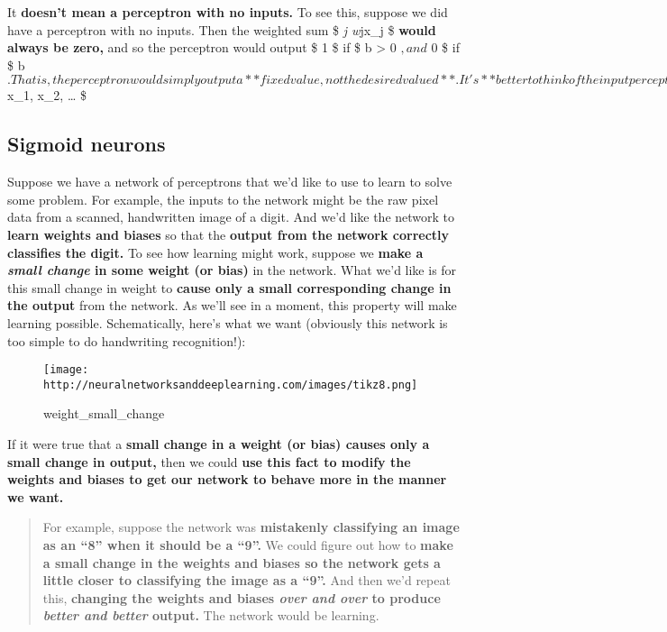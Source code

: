 \documentclass[]{article}
\begin{document}
It \textbf{doesn't mean a perceptron with no inputs.} To see this,
suppose we did have a perceptron with no inputs. Then the weighted sum
\$ \sum\emph{j w}jx\_j \$ \textbf{would always be zero,} and so the
perceptron would output \$ 1 \$ if \$ b \textgreater{} 0 $, and $ 0 \$
if \$ b 
$. That is, the perceptron would simply output a **fixed value, not the desired valued**. It's **better to think of the input perceptrons as not really being perceptrons at all, but rather special units which are simply defined to output the desired values,** $
x\_1, x\_2, \ldots{} \$

\subsection{Sigmoid neurons}\label{sigmoid-neurons}

Suppose we have a network of perceptrons that we'd like to use to learn
to solve some problem. For example, the inputs to the network might be
the raw pixel data from a scanned, handwritten image of a digit. And
we'd like the network to \textbf{learn weights and biases} so that the
\textbf{output from the network correctly classifies the digit.} To see
how learning might work, suppose we \textbf{make a \emph{small change}
in some weight (or bias)} in the network. What we'd like is for this
small change in weight to \textbf{cause only a small corresponding
change in the output} from the network. As we'll see in a moment, this
property will make learning possible. Schematically, here's what we want
(obviously this network is too simple to do handwriting recognition!):

\begin{figure}[htbp]
\centering
\texttt{[image: http://neuralnetworksanddeeplearning.com/images/tikz8.png]}
\caption{weight\_small\_change}
\end{figure}

If it were true that a \textbf{small change in a weight (or bias) causes
only a small change in output,} then we could \textbf{use this fact to
modify the weights and biases to get our network to behave more in the
manner we want.}

\begin{quote}
For example, suppose the network was \textbf{mistakenly classifying an
image as an ``8'' when it should be a ``9''.} We could figure out how to
\textbf{make a small change in the weights and biases so the network
gets a little closer to classifying the image as a ``9''.} And then we'd
repeat this, \textbf{changing the weights and biases \emph{over and
over} to produce \emph{better and better} output.} The network would be
learning.
\end{quote}
\end{document}
